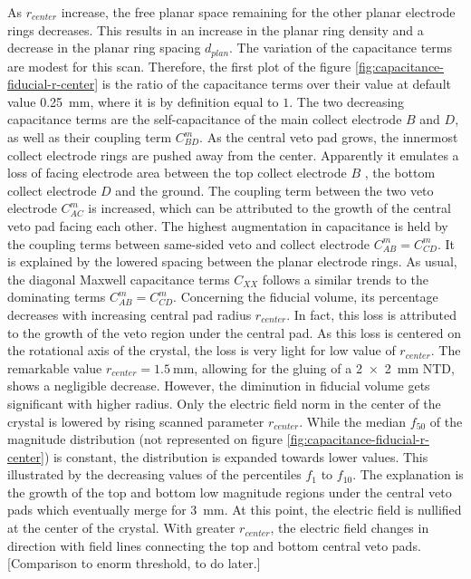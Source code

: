 As $r_{center}$ increase, the free planar space remaining for the other planar electrode rings decreases. This results in an increase in the planar ring density and a decrease in the planar ring spacing $d_{plan}$.
The variation of the capacitance terms are modest for this scan. Therefore, the first plot of the figure \ref{fig:capacitance-fiducial-r-center} is the ratio of the capacitance terms over their value at default value \SI{0.25}{\mm}, where it is by definition equal to $1$. The two decreasing capacitance terms are the self-capacitance of the main collect electrode $B$ and $D$, as well as their coupling term $C_{BD}^m$. As the central veto pad grows, the innermost collect electrode rings are pushed away from the center. Apparently it emulates a loss of facing electrode area between the top collect electrode $B$ , the bottom collect electrode $D$ and the ground. The coupling term between the two veto electrode $C_{AC}^m$ is increased, which can be attributed to the growth of the central veto pad facing each other. The highest augmentation in capacitance is held by the coupling terms between same-sided veto and collect electrode $C_{AB}^m=C_{CD}^m$. It is explained by the lowered spacing between the planar electrode rings. As usual, the diagonal Maxwell capacitance terms $C_{XX}$ follows a similar trends to the dominating terms $C_{AB}^m=C_{CD}^m$.
Concerning the fiducial volume, its percentage decreases with increasing central pad radius $r_{center}$. In fact, this loss is attributed to the growth of the veto region under the central pad. As this loss is centered on the rotational axis of the crystal, the loss is very light for low value of $r_{center}$. The remarkable value $r_{center} = \SI{1.5}{\mm}$, allowing for the gluing of a \SI{2 x 2}{\mm} NTD, shows a negligible decrease. However, the diminution in fiducial volume gets significant with higher radius.
Only the electric field norm in the center of the crystal is lowered by rising scanned parameter $r_{center}$. While the median $f_{50}$ of the magnitude distribution (not represented on figure \ref{fig:capacitance-fiducial-r-center}) is constant, the distribution is expanded towards lower values. This illustrated by the decreasing values of the percentiles $f_{1}$ to $f_{10}$. The explanation is the growth of the top and bottom low magnitude regions under the central veto pads which eventually merge for \SI{3}{\mm}. At this point, the electric field is nullified at the center of the crystal. With greater $r_{center}$, the electric field changes in direction with field lines connecting the top and bottom central veto pads.
{\color{red} [Comparison to enorm threshold, to do later.]}

